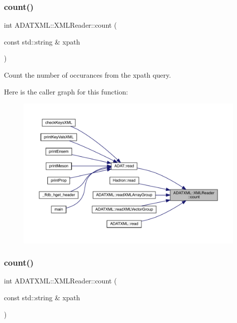 \subsubsection{\texorpdfstring{count()}{count()}\hspace{0.1cm}{\footnotesize\ttfamily [1/3]}}
{\footnotesize\ttfamily int A\+D\+A\+T\+X\+M\+L\+::\+X\+M\+L\+Reader\+::count (\begin{DoxyParamCaption}\item[{const std\+::string \&}]{xpath }\end{DoxyParamCaption})}



Count the number of occurances from the xpath query. 

Here is the caller graph for this function\+:
\nopagebreak
\begin{figure}[H]
\begin{center}
\leavevmode
\includegraphics[width=350pt]{db/d3f/classADATXML_1_1XMLReader_a59584913f1338d956de60adef16a0718_icgraph}
\end{center}
\end{figure}
\mbox{\label{classADATXML_1_1XMLReader_a59584913f1338d956de60adef16a0718}} 
\subsubsection{\texorpdfstring{count()}{count()}\hspace{0.1cm}{\footnotesize\ttfamily [2/3]}}
{\footnotesize\ttfamily int A\+D\+A\+T\+X\+M\+L\+::\+X\+M\+L\+Reader\+::count (\begin{DoxyParamCaption}\item[{const std\+::string \&}]{xpath }\end{DoxyParamCaption})}



